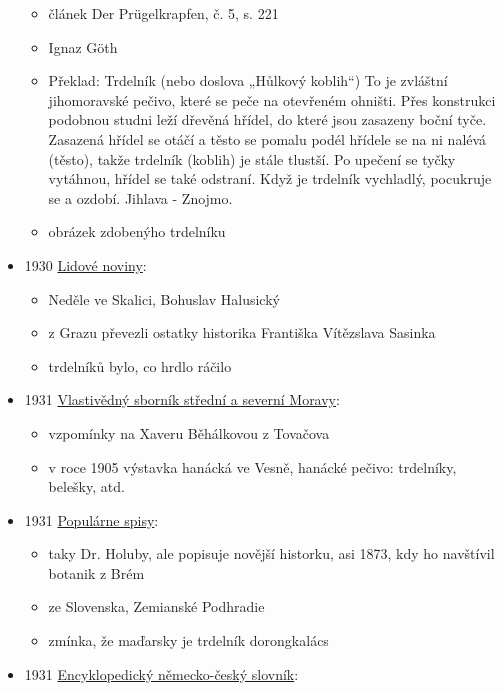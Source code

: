 \begin{itemize}
  \begin{itemize}
  \tightlist
  \item
    článek Der Prügelkrapfen, č. 5, s. 221
  \item
    Ignaz Göth
  \item
    Překlad: Trdelník (nebo doslova „Hůlkový koblih``) To je zvláštní
    jihomoravské pečivo, které se peče na otevřeném ohništi. Přes
    konstrukci podobnou studni leží dřevěná hřídel, do které jsou
    zasazeny boční tyče. Zasazená hřídel se otáčí a těsto se pomalu
    podél hřídele se na ni nalévá (těsto), takže trdelník (koblih) je
    stále tlustší. Po upečení se tyčky vytáhnou, hřídel se také
    odstraní. Když je trdelník vychladlý, pocukruje se a ozdobí. Jihlava
    - Znojmo.
  \item
    obrázek zdobenýho trdelníku
  \end{itemize}
\item
  1930
  \href{https://ceskadigitalniknihovna.cz/uuid/uuid:af245650-9670-11dc-8c7e-000d606f5dc6}{Lidové
  noviny}:

  \begin{itemize}
  \tightlist
  \item
    Neděle ve Skalici, Bohuslav Halusický
  \item
    z Grazu převezli ostatky historika Františka Vítězslava Sasinka
  \item
    trdelníků bylo, co hrdlo ráčilo
  \end{itemize}
\item
  1931
  \href{https://www.digitalniknihovna.cz/vkol/uuid/uuid:c2c8f360-7588-407d-9bc7-d0c59adde597}{Vlastivědný
  sborník střední a severní Moravy}:

  \begin{itemize}
  \tightlist
  \item
    vzpomínky na Xaveru Běhálkovou z Tovačova
  \item
    v roce 1905 výstavka hanácká ve Vesně, hanácké pečivo: trdelníky,
    belešky, atd.
  \end{itemize}
\item
  1931
  \href{https://ndk.cz/view/uuid:dc35f5d0-c266-11ed-ac82-5ef3fc9bb22f?page=uuid\%3Acb35b596-b227-47df-bc08-358154471f54}{Populárne
  spisy}:

  \begin{itemize}
  \tightlist
  \item
    taky Dr. Holuby, ale popisuje novější historku, asi 1873, kdy ho
    navštívil botanik z Brém
  \item
    ze Slovenska, Zemianské Podhradie
  \item
    zmínka, že maďarsky je trdelník dorongkalács
  \end{itemize}
\item
  1931
  \href{https://ceskadigitalniknihovna.cz/uuid/uuid:918bbf20-d4ea-11e7-a047-005056825209}{Encyklopedický
  německo-český slovník}:


\end{itemize}
